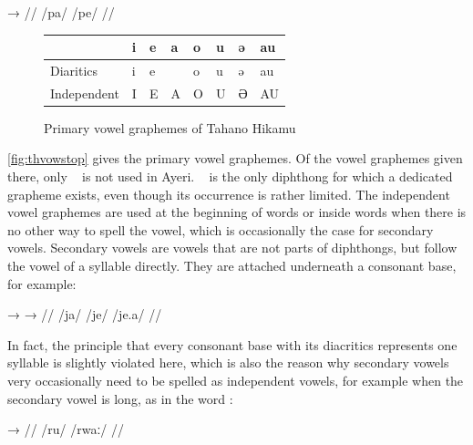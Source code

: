 \pex[lingstyle=thex]\begingl
	\gla {}	→	 //
	\glb /pa/	{}	/pe/ //
\endgl\xe

\begin{figure}[th]
\caption{Primary vowel graphemes of Tahano Hikamu}

\begin{tabu} to \linewidth{H[c] X[c] X[c] X[c] X[c] X[c] X[c] X[c]}
\toprule
\tableheaderfont

	& i
	& e
	& a
	& o
	& u
	& ə
	& au
	\\
	
\toprule
	
Diaritics
	& \Tagati\huge *i
	& \Tagati\huge *e
	& \Tagati\huge {}
	& \Tagati\huge *o
	& \Tagati\huge *u
	& \Tagati\huge *ə
	& \Tagati\huge *au
	\\

\midrule

Independent
	& \Tagati\huge I
	& \Tagati\huge E
	& \Tagati\huge A
	& \Tagati\huge O
	& \Tagati\huge U
	& \Tagati\huge Ə
	& \Tagati\huge AU
	\\

\bottomrule
\end{tabu}
\label{fig:thvowstop}
\end{figure}

\autoref{fig:thvowstop} gives the primary vowel graphemes. Of the vowel 
graphemes given there, only ~ is not used in Ayeri. 
~ is the only diphthong for which a dedicated grapheme 
exists, even though its occurrence is rather limited. The independent vowel 
graphemes are used at the beginning of words or inside words when there is no 
other way to spell the vowel, which is occasionally the case for secondary 
vowels. Secondary vowels are vowels that are not parts of diphthongs, but follow 
the vowel of a syllable directly. They are attached underneath a consonant base, 
for example:

\pex[lingstyle=thex]\begingl
	\gla {}	→		→	 //
	\glb /ja/	{}	/je/		{}	/je.a/ //
\endgl\xe

In fact, the principle that every consonant base with its diacritics represents 
one syllable is slightly violated here, which is also the reason why secondary 
vowels very occasionally need to be spelled as independent vowels, for example 
when the secondary vowel is long, as in the word :

\pex[lingstyle=thex]\begingl
	\gla {}	→	 //
	\glb /ru/	{}	/rwaː/ //
\endgl\xe

